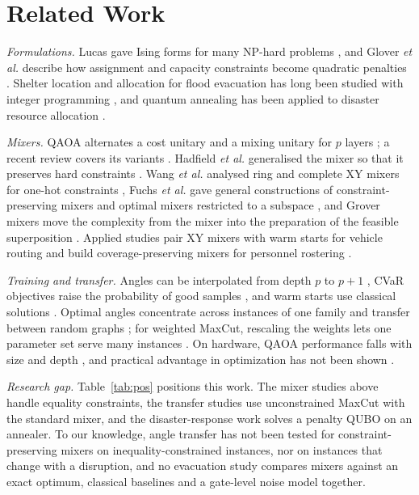 \documentclass[conference]{IEEEtran}
\begin{document}
\section{Related Work}
\textit{Formulations.} Lucas gave Ising forms for many NP-hard problems \cite{Lucas2014}, and Glover \textit{et al.} describe how assignment and capacity constraints become quadratic penalties \cite{Glover2019}. Shelter location and allocation for flood evacuation has long been studied with integer programming \cite{Sherali1991}, and quantum annealing has been applied to disaster resource allocation \cite{Cadelina2024}.

\textit{Mixers.} QAOA alternates a cost unitary and a mixing unitary for $p$ layers \cite{Farhi2014}; a recent review covers its variants \cite{Blekos2024}. Hadfield \textit{et al.} generalised the mixer so that it preserves hard constraints \cite{Hadfield2019}. Wang \textit{et al.} analysed ring and complete XY mixers for one-hot constraints \cite{WangZ2020}, Fuchs \textit{et al.} gave general constructions of constraint-preserving mixers \cite{Fuchs2022} and optimal mixers restricted to a subspace \cite{Fuchs2024}, and Grover mixers move the complexity from the mixer into the preparation of the feasible superposition \cite{Bartschi2020}. Applied studies pair XY mixers with warm starts for vehicle routing \cite{doCarmo2025} and build coverage-preserving mixers for personnel rostering \cite{Gupta2026}.

\textit{Training and transfer.} Angles can be interpolated from depth $p$ to $p{+}1$ \cite{Zhou2020}, CVaR objectives raise the probability of good samples \cite{Barkoutsos2020}, and warm starts use classical solutions \cite{Egger2021}. Optimal angles concentrate across instances of one family \cite{Brandao2018} and transfer between random graphs \cite{Galda2021}; for weighted MaxCut, rescaling the weights lets one parameter set serve many instances \cite{Shaydulin2023}. On hardware, QAOA performance falls with size and depth \cite{Harrigan2021}, and practical advantage in optimization has not been shown \cite{Preskill2018,Bharti2022,Abbas2024}.

\textit{Research gap.} Table~\ref{tab:pos} positions this work. The mixer studies above handle equality constraints, the transfer studies use unconstrained MaxCut with the standard mixer, and the disaster-response work solves a penalty QUBO on an annealer. To our knowledge, angle transfer has not been tested for constraint-preserving mixers on inequality-constrained instances, nor on instances that change with a disruption, and no evacuation study compares mixers against an exact optimum, classical baselines and a gate-level noise model together.
\end{document}
